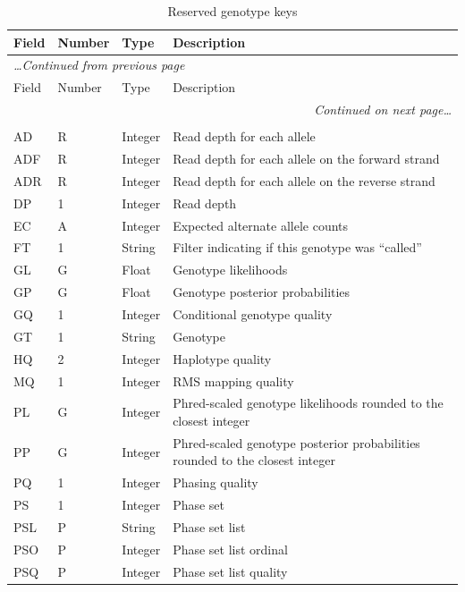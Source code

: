 \documentclass[8pt]{article}
\begin{document}
\begin{longtable}[c]{ | p{2.5cm} | p{1.5cm} | p{1.5cm} | p{10.3cm} | }
      \hline
      Field		& Number	& Type		& Description \\ \hline
  \endfirsthead
      \multicolumn{4}{l}{\small\emph{\ldots Continued from previous page}} \\[0.7ex]
      \hline
      Field		& Number	& Type		& Description \\ \hline
  \endhead
      \hline
      \multicolumn{4}{r}{\small\emph{Continued on next page\ldots}} \\
      \caption[]{Reserved genotype keys}
  \endfoot
      \hline
      \multicolumn{4}{l}{} \\
      \caption{Reserved genotype keys}
      \label{table:reserved-genotypes}
  \endlastfoot
      AD		& R		& Integer	& Read depth for each allele \\
      ADF		& R		& Integer	& Read depth for each allele on the forward strand \\
      ADR		& R		& Integer	& Read depth for each allele on the reverse strand \\
      DP		& 1		& Integer	& Read depth \\
      EC		& A		& Integer	& Expected alternate allele counts \\
      FT		& 1		& String	& Filter indicating if this genotype was ``called'' \\
      GL		& G		& Float		& Genotype likelihoods \\
      GP		& G		& Float		& Genotype posterior probabilities \\
      GQ		& 1		& Integer	& Conditional genotype quality \\
      GT		& 1		& String	& Genotype \\
      HQ		& 2		& Integer	& Haplotype quality \\
      MQ		& 1		& Integer	& RMS mapping quality \\
      PL		& G		& Integer	& Phred-scaled genotype likelihoods rounded to the closest integer \\
      PP		& G		& Integer	& Phred-scaled genotype posterior probabilities rounded to the closest integer \\
      PQ		& 1		& Integer	& Phasing quality \\
      PS		& 1		& Integer	& Phase set \\
      PSL		& P		& String	& Phase set list \\
      PSO		& P		& Integer	& Phase set list ordinal \\
      PSQ		& P		& Integer	& Phase set list quality \\

\end{longtable}
\end{document}
